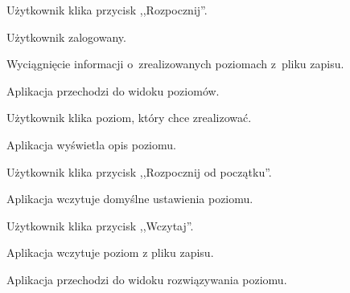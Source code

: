 \documentclass[12pt, a4paper]{article} %
\begin{document}
\hfill \break
\begin{usecase}
	\noaka
	\addpath
	\begin{usecases}
		\item Użytkownik klika przycisk ,,Rozpocznij''.
		\begin{usecases}
			\item Użytkownik zalogowany.
			\begin{usecases}
				\item Wyciągnięcie informacji o~zrealizowanych poziomach z~pliku zapisu.
			\end{usecases}
		\end{usecases}
		\item Aplikacja przechodzi do widoku poziomów.
		\item Użytkownik klika poziom, który chce zrealizować.
		\item Aplikacja wyświetla opis poziomu.
		\begin{usecases}
			\item Użytkownik klika przycisk ,,Rozpocznij od początku''.
			\begin{usecases}
				\item Aplikacja wczytuje domyślne ustawienia poziomu.
			\end{usecases}
			\item Użytkownik klika przycisk ,,Wczytaj''.
			\begin{usecases}
				\item Aplikacja wczytuje poziom z pliku zapisu.
			\end{usecases}
		\end{usecases}
		\item Aplikacja przechodzi do widoku rozwiązywania poziomu.
	\end{usecases}
\end{usecase}
\end{document}
